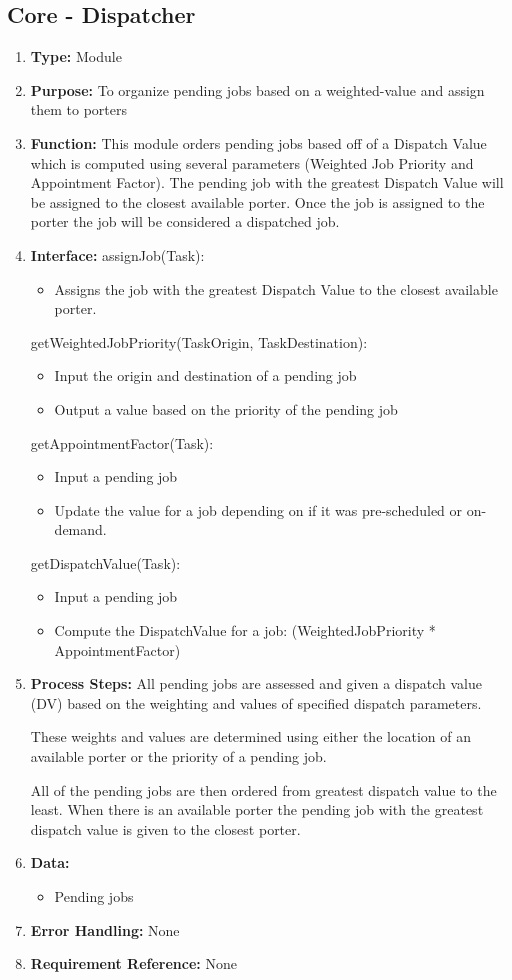 \documentclass[paper=letter, fontsize=10pt]{scrartcl}
\numberwithin{equation}{section}		%
\numberwithin{figure}{section}			%
\numberwithin{table}{section}				%
\begin{document}
\subsection{Core - Dispatcher}
\begin{enumerate}[]
	\item \textbf{Type:} Module
	\item \textbf{Purpose:} To organize pending jobs based on a weighted-value and assign them to porters 
	\item \textbf{Function:} This module orders pending jobs based off of a Dispatch Value which is computed using several parameters (Weighted Job Priority and Appointment Factor).  The pending job with the greatest Dispatch Value will be assigned to the closest available porter.  Once the job is assigned to the porter the job will be considered a dispatched job.
	\item \textbf{Interface:} \newline
	 assignJob(Task):
	 	\begin{itemize}
	 		\item Assigns the job with the greatest Dispatch Value to the closest available porter.
	 	\end{itemize}
	 getWeightedJobPriority(TaskOrigin, TaskDestination):
	 	\begin{itemize}
	 		\item Input the origin and destination of a pending job
	 		\item Output a value based on the priority of the pending job
	 	\end{itemize}
	 getAppointmentFactor(Task):
	 	\begin{itemize}
	 		\item Input a pending job
	 		\item Update the value for a job depending on if it was pre-scheduled or on-demand.
	 	\end{itemize}
	 getDispatchValue(Task):
	 	\begin{itemize}
	 		\item Input a pending job
	 		\item Compute the DispatchValue for a job: (WeightedJobPriority * AppointmentFactor) 
	 	\end{itemize}
	\item \textbf{Process Steps:}
	All pending jobs are assessed and given a dispatch value (DV) based on the weighting and values of specified dispatch parameters.
	
	These weights and values are determined using either the location of an available porter or the priority of a pending job.
	
	All of the pending jobs are then ordered from greatest dispatch value to the least.  When there is an available porter the pending job with the greatest dispatch value is given to the closest porter.
	\item \textbf{Data:}
		\begin{itemize}
			\item Pending jobs
		\end{itemize}
	\item \textbf{Error Handling:} None
	\item \textbf{Requirement Reference:} None
\end{enumerate}
\end{document}
